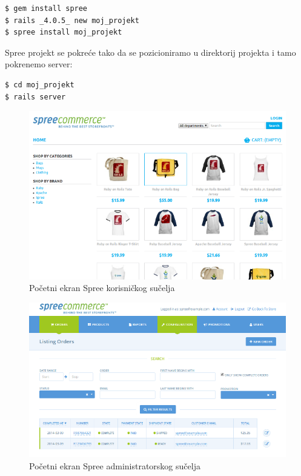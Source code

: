 \begin{lstlisting}[language=bash]
$ gem install spree
$ rails _4.0.5_ new moj_projekt
$ spree install moj_projekt
\end{lstlisting}

Spree projekt se pokreće tako da se pozicioniramo u direktorij projekta i tamo pokrenemo server:
\begin{lstlisting}[language=bash]
$ cd moj_projekt
$ rails server
\end{lstlisting}

\begin{figure}[H]
    \centering
    \includegraphics[scale=0.66]{pictures/spree-small}
    \caption{Početni ekran Spree korisničkog sučelja}
    \label{pic:spree}
\end{figure}

\begin{figure}[H]
    \centering
    \includegraphics[scale=0.66]{pictures/spree-admin-small}
    \caption{Početni ekran Spree administratorskog sučelja}
    \label{pic:spreeAdmin}
\end{figure}

